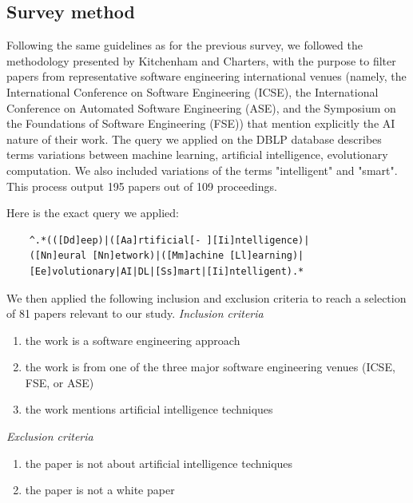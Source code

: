 
\subsection{Survey method}
Following the same guidelines as for the previous survey, we followed the methodology presented by Kitchenham and Charters, with the purpose to filter papers from representative software engineering international venues (namely, the International Conference on Software Engineering (ICSE), the International Conference on Automated Software Engineering (ASE), and the Symposium on the Foundations of Software Engineering (FSE)) that mention explicitly the AI nature of their work. The query we applied on the DBLP database describes terms variations between machine learning, artificial intelligence, evolutionary computation. We also included variations of the terms "intelligent" and "smart". This process output 195 papers out of 109 proceedings. 

Here is the exact query we applied:
\begin{verbatim}
	^.*(([Dd]eep)|([Aa]rtificial[- ][Ii]ntelligence)|
	([Nn]eural [Nn]etwork)|([Mm]achine [Ll]earning)|
	[Ee]volutionary|AI|DL|[Ss]mart|[Ii]ntelligent).*
\end{verbatim}

We then applied the following inclusion and exclusion criteria to reach a selection of 81 papers relevant to our study.
\textit{Inclusion criteria}
\begin{enumerate}
	\item the work is a software engineering approach
	\item the work is from one of the three major software engineering venues (ICSE, FSE, or ASE)
	\item the work mentions artificial intelligence techniques
\end{enumerate}

\textit{Exclusion criteria}
\begin{enumerate}
	\item the paper is not about artificial intelligence techniques
	\item the paper is not a white paper
\end{enumerate}

